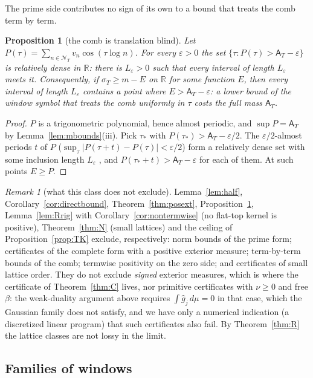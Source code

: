 \documentclass[11pt]{amsart}
\newtheorem{proposition}[theorem]{Proposition}
\theoremstyle{definition}
\theoremstyle{remark}
\newtheorem{remark}[theorem]{Remark}
\newcommand{\R}{\mathbb R}
\newcommand{\sT}{\sigma_T}
\newcommand{\gh}[1]{\widehat g_{#1}}
\newcommand{\NT}{\mathcal N_T}
\newcommand{\Aconst}{\mathsf A_T}
\begin{document}
The prime side contributes no sign of its own to a bound that treats the comb term by term.

\begin{proposition}[the comb is translation blind]\label{prop:primeblind}
Let $P(\tau)=\sum_{n\in\NT}v_n\cos(\tau\log n)$. For every $\varepsilon>0$ the set $\{\tau:P(\tau)>\Aconst-\varepsilon\}$ is
relatively dense in $\R$: there is $L_\varepsilon>0$ such that every interval of length $L_\varepsilon$ meets it.
Consequently, if $\sT\ge m-E$ on $\R$ for some function $E$, then every interval of length $L_\varepsilon$ contains a
point where $E>\Aconst-\varepsilon$: a lower bound of the window symbol that treats the comb uniformly in $\tau$ costs
the full mass $\Aconst$.
\end{proposition}
\begin{proof}
$P$ is a trigonometric polynomial, hence almost periodic, and $\sup P=\Aconst$ by Lemma~\ref{lem:mbounds}(iii). Pick
$\tau_*$ with $P(\tau_*)>\Aconst-\varepsilon/2$. The $\varepsilon/2$-almost periods $t$ of $P$
($\sup_\tau|P(\tau+t)-P(\tau)|<\varepsilon/2$) form a relatively dense set with some inclusion length $L_\varepsilon$
\cite[Ch.~VI]{Katznelson}, and $P(\tau_*+t)>\Aconst-\varepsilon$ for each of them. At such points $E\ge P$.
\end{proof}

\begin{remark}[what this class does not exclude]\label{rem:bar-lin}
Lemma~\ref{lem:half}, Corollary~\ref{cor:directbound}, Theorem~\ref{thm:posext}, Proposition~\ref{prop:primeblind},
Lemma~\ref{lem:Rrig} with Corollary~\ref{cor:nontermwise} (no flat-top kernel is positive), Theorem~\ref{thm:N}
(small lattices) and the ceiling of Proposition~\ref{prop:TK} exclude, respectively: norm bounds of the prime
form; certificates of the complete form with a positive exterior measure; term-by-term bounds of the comb;
termwise positivity on the zero side; and certificates of small lattice order. They do not exclude
\emph{signed} exterior measures, which is where the certificate of Theorem~\ref{thm:C} lives, nor primitive
certificates with $\nu\ge0$ and free $\beta$: the weak-duality argument above requires $\int\gh j\,d\mu=0$ in that
case, which the Gaussian family does not satisfy, and we have only a numerical indication (a discretized linear
program) that such certificates also fail. By Theorem~\ref{thm:R} the lattice classes are not lossy in the limit.
\end{remark}

\subsection{Families of windows}\label{subsec:bar-fam}
\end{document}
